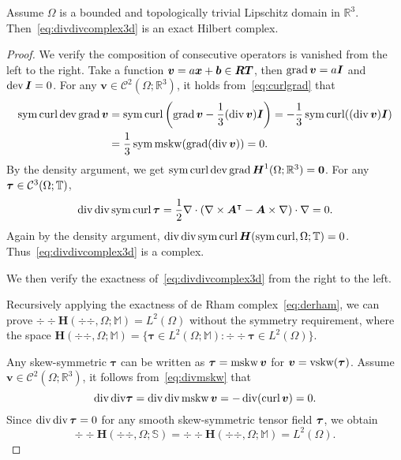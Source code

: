 \begin{theorem}\label{thm:divdivcomplex}
Assume $\Omega$ is a bounded and topologically trivial Lipschitz domain in $\mathbb R^3$. Then~\eqref{eq:divdivcomplex3d} is an exact Hilbert complex.   
\end{theorem}
\begin{proof}
We verify the composition of consecutive operators is vanished from the left to the right. Take a function $\boldsymbol v = a\boldsymbol x + \boldsymbol b\in \boldsymbol{RT}$, then $\operatorname{grad} \boldsymbol v = a \boldsymbol I$ and $\operatorname{dev} \boldsymbol I = 0$. For any $\boldsymbol v\in \mathcal C^2(\Omega;\mathbb R^3)$, it holds from~\eqref{eq:curlgrad} that
\begin{align*}
\operatorname{sym}\operatorname{curl}\operatorname{dev}\operatorname{grad}\boldsymbol v&=\operatorname{sym}\operatorname{curl}\left(\operatorname{grad}\boldsymbol v-\frac{1}{3}(\operatorname{div}\boldsymbol v) \boldsymbol I\right)=-\frac{1}{3}\operatorname{sym}\operatorname{curl}((\operatorname{div}\boldsymbol v) \boldsymbol I) \\
&=\frac{1}{3}\operatorname{sym}\operatorname{mskw}(\operatorname{grad}(\operatorname{div}\boldsymbol v))=0.
\end{align*}
By the density argument, we get $\operatorname{sym}\operatorname{curl}\operatorname{dev}\operatorname{grad}\boldsymbol H^1(\Omega;\mathbb R^3)=\boldsymbol0$. 
%
For any $\boldsymbol\tau\in\mathcal C^3(\Omega;\mathbb T)$, %
\[
\operatorname{div}\operatorname{div}\operatorname{sym}\operatorname{curl}\boldsymbol\tau= \frac{1}{2}\nabla \cdot (\nabla \times \boldsymbol A^{\intercal} - \boldsymbol A\times\nabla )\cdot \nabla =0.
\]
Again by the density argument, $\operatorname{div}\operatorname{div}\operatorname{sym}\operatorname{curl}\boldsymbol H(\operatorname{sym}\operatorname{curl},\Omega;\mathbb T)=0$.
Thus~\eqref{eq:divdivcomplex3d} is a complex.

We then verify the exactness of~\eqref{eq:divdivcomplex3d} from the right to the left.

\medskip
{} 

Recursively applying the exactness of de Rham complex~\eqref{eq:derham}, we can prove $\div\div\boldsymbol H(\div\div, \Omega;\mathbb M)=L^2(\Omega)$ without the symmetry requirement, where the space $\boldsymbol H(\div\div, \Omega;\mathbb M)=\{\boldsymbol \tau \in L^2(\Omega; \mathbb M): \div\div \boldsymbol \tau \in L^2(\Omega)\}$.

Any skew-symmetric $\boldsymbol \tau$ can be written as $\boldsymbol \tau =\operatorname{mskw}\boldsymbol v$ for $\boldsymbol v = \operatorname{vskw} (\boldsymbol \tau)$. Assume $\boldsymbol v\in \mathcal C^2(\Omega; \mathbb R^3)$, it follows from~\eqref{eq:divmskw} that
\begin{equation}\label{eq:divdivskw0}
\operatorname{div}{\operatorname{div}}\boldsymbol \tau=\operatorname{div}{\operatorname{div}}\operatorname{mskw}\boldsymbol v= - \operatorname{div}(\operatorname{curl}\boldsymbol v)=0.
\end{equation}
Since $\operatorname{div}\operatorname{div}\boldsymbol\tau=0$ for any smooth skew-symmetric tensor field $\boldsymbol\tau$, we obtain
$$
\div\div\boldsymbol H(\div\div, \Omega;\mathbb S)=\div\div\boldsymbol H(\div\div, \Omega;\mathbb M)=L^2(\Omega).
$$


\end{proof}
